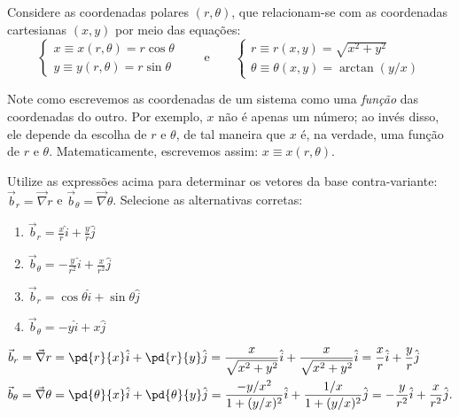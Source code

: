 \begin{question}
    Considere as coordenadas polares $(r,\theta)$, que relacionam-se com as coordenadas cartesianas $(x,y)$ por meio das equações:
    \begin{equation}
      \left\{
      \begin{matrix}
        x \equiv x(r, \theta) = r \cos\theta \\
        y \equiv y(r, \theta) = r \sin\theta
      \end{matrix}
      \right.
      \qquad\text{e}\qquad
      \left\{
      \begin{matrix}
        r \equiv r(x,y) = \sqrt{x^2 + y^2} \\
        \theta \equiv \theta(x,y) = \arctan\left(y/x\right)
      \end{matrix}
      \right.
    \end{equation}

    Note como escrevemos as coordenadas de um sistema como uma \emph{função} das coordenadas do outro.
    Por exemplo, $x$ não é apenas um número; ao invés disso, ele depende da escolha de $r$ e $\theta$, de tal maneira que $x$ é, na verdade, uma função de $r$ e $\theta$.
    Matematicamente, escrevemos assim: $x \equiv x(r,\theta)$.

    Utilize as expressões acima para determinar os vetores da base contra-variante: $\vec b_r = \vec\nabla r$ e $\vec b_\theta = \vec\nabla \theta$.
    Selecione as alternativas corretas:
    \begin{enumerate}
      \item $\vec b_r = \frac{x}{r}\hat i + \frac{y}{r}\hat j$ \rightanswer
      \item $\vec b_\theta = -\frac{y}{r^2}\hat i + \frac{x}{r^2}\hat j$ \rightanswer
      \item $\vec b_r = \cos\theta\hat i + \sin\theta\hat j$
      \item $\vec b_\theta = -y\hat i + x\hat j$
    \end{enumerate}

    \begin{solution}
      \begin{align*}
        \vec b_r = \vec\nabla r &= \pd{r}{x}\hat i + \pd{r}{y}\hat j = \frac{x}{\sqrt{x^2 + y^2}}\hat i + \frac{x}{\sqrt{x^2 + y^2}}\hat i
          = \frac{x}{r}\hat i + \frac{y}{r}\hat j\\
        \vec b_\theta = \vec\nabla \theta &= \pd{\theta}{x}\hat i + \pd{\theta}{y}\hat j = \frac{-y/x^2}{1 + (y/x)^2}\hat i + \frac{1/x}{1 + (y/x)^2} \hat j
          = -\frac{y}{r^2}\hat i + \frac{x}{r^2}\hat j.
      \end{align*}
    \end{solution}
\end{question}